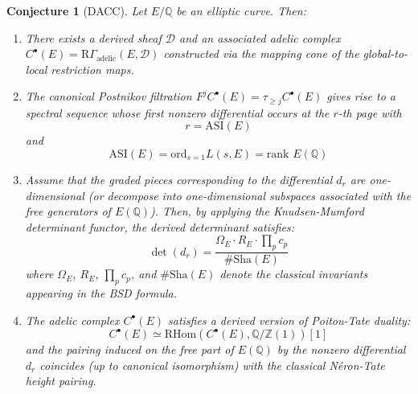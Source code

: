 \documentclass{article}
\theoremstyle{plain}
\newtheorem{conjecture}[theorem]{Conjecture}
\theoremstyle{definition}
\theoremstyle{remark}
\begin{document}
\begin{conjecture}[DACC]
Let $E/\mathbb{Q}$ be an elliptic curve. Then:
\begin{enumerate}
\item There exists a derived sheaf $\mathcal{D}$ and an associated adelic complex $C^{\bullet}(E) = \text{R}\Gamma_{\text{adelic}}(E, \mathcal{D})$ constructed via the mapping cone of the global-to-local restriction maps.

\item The canonical Postnikov filtration $F^j C^{\bullet}(E) = \tau_{\geq j}C^{\bullet}(E)$ gives rise to a spectral sequence whose first nonzero differential occurs at the $r$-th page with 
   $$r = \text{ASI}(E)$$
   and
   $$\text{ASI}(E) = \text{ord}_{s=1} L(s, E) = \text{rank } E(\mathbb{Q})$$

\item Assume that the graded pieces corresponding to the differential $d_r$ are one-dimensional (or decompose into one-dimensional subspaces associated with the free generators of $E(\mathbb{Q})$). Then, by applying the Knudsen-Mumford determinant functor, the derived determinant satisfies:
   $$\det(d_r) = \frac{\Omega_E \cdot R_E \cdot \prod_p c_p}{\#\text{Sha}(E)}$$
   where $\Omega_E$, $R_E$, $\prod_p c_p$, and $\#\text{Sha}(E)$ denote the classical invariants appearing in the BSD formula.

\item The adelic complex $C^{\bullet}(E)$ satisfies a derived version of Poitou-Tate duality:
   $$C^{\bullet}(E) \simeq \text{R}\text{Hom}(C^{\bullet}(E), \mathbb{Q}/\mathbb{Z}(1))[1]$$
   and the pairing induced on the free part of $E(\mathbb{Q})$ by the nonzero differential $d_r$ coincides (up to canonical isomorphism) with the classical Néron-Tate height pairing.
\end{enumerate}
\end{conjecture}
\end{document}
